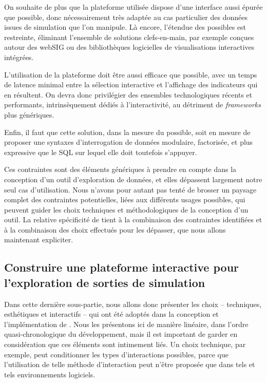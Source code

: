 On souhaite de plus que la plateforme utilisée dispose d'une interface aussi épurée que possible, donc nécessairement très adaptée au cas particulier des données issues de simulation que l'on manipule.
Là encore, l'étendue des possibles est restreinte, éliminant l'ensemble de solutions \og clefs-en-main\fg{}, par exemple conçues autour des \og webSIG\fg{} ou des bibliothèques logicielles de visualisations interactives intégrées.

L'utilisation de la plateforme doit être aussi efficace que possible, avec un temps de latence minimal entre la sélection interactive et l'affichage des indicateurs qui en résultent.
On devra donc privilégier des ensembles technologiques récents et performants, intrinsèquement dédiés à l'interactivité, au détriment de \textit{frameworks} plus génériques.

Enfin, il faut que cette solution, dans la mesure du possible, soit en mesure de proposer une syntaxes d'interrogation de données modulaire, factorisée, et plus expressive que le SQL sur lequel elle doit toutefois s'appuyer.

Ces contraintes sont des éléments génériques à prendre en compte dans la conception d'un outil d'exploration de données, et elles dépassent largement notre seul cas d'utilisation.
Nous n'avons pour autant pas tenté de brosser un paysage complet des contraintes potentielles, liées aux différents usages possibles, qui peuvent guider les choix techniques et méthodologiques de la conception d'un outil.
La relative spécificité de \simedb{} tient à la combinaison des contraintes identifiées et à la combinaison des choix effectués pour les dépasser, que nous allons maintenant expliciter.

\subsection{Construire une plateforme interactive pour l'exploration de sorties de simulation}

Dans cette dernière sous-partie, nous allons donc présenter les choix -- techniques, esthétiques et interactifs -- qui ont été adoptés dans la conception et l'implémentation de \simedb{}.
Nous les présentons ici de manière linéaire, dans l'ordre quasi-chronologique du développement, mais il est important de garder en considération que ces éléments sont intimement liés.
Un choix technique, par exemple, peut conditionner les types d'interactions possibles, parce que l'utilisation de telle méthode d'interaction peut n'être proposée que dans tels et tels environnements logiciels.

